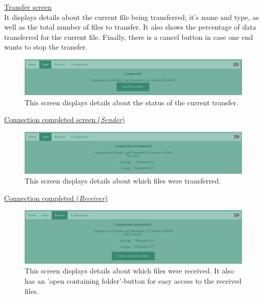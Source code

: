     \noindent
    \underline{Transfer screen}\\
      It displays details about the current file being transferred; it's name and type, as well as the total number of files to transfer. It also shows the percentage of data transferred for the current file. Finally, there is a cancel button in case one end wants to stop the transfer.
    \begin{figure}[H]
      \centering
      \includegraphics[width=\textwidth]{Figures/Base/transfer}
      \decoRule
      \caption[SendIt: Transfer screen]{This screen displays details about the status of the current transfer.}
      \label{fig:SL_trans}
    \end{figure}

    \noindent
    \underline{Connection completed screen (\emph{Sender})}
    \begin{figure}[H]
      \centering
      \includegraphics[width=\textwidth]{Figures/Base/sender_complete}
      \decoRule
      \caption[SendIt: Final screen (Sender)]{This screen displays details about which files were transferred.}
      \label{fig:SL_rec1}
    \end{figure}

    \noindent
    \underline{Connection completed (\emph{Receiver})}
    \begin{figure}[H]
      \centering
      \includegraphics[width=\textwidth]{Figures/Base/receiver_complete}
      \decoRule
      \caption[SendIt: Final screen (Receiver)]{This screen displays details about which files were received. It also has an 'open containing folder'-button for easy access to the received files.}
      \label{fig:SL_rec2}
    \end{figure}
%
